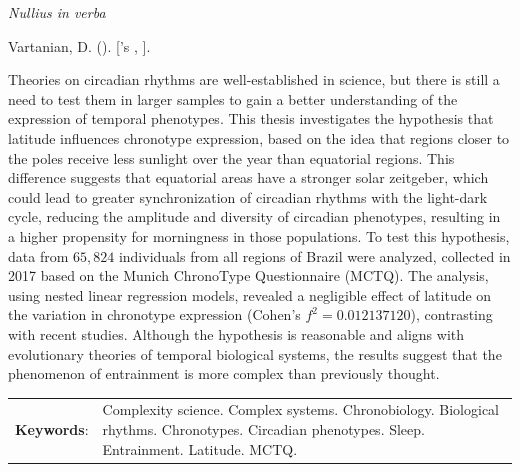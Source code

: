 \documentclass[
12pt,
openright,
oneside,
a4paper,
chapter=TITLE,
section=TITLE,
french,
spanish,
brazil,
english
]{abntex2}\usepackage{array}
\renewcommand{\epigraphname}{Epigraph}
\renewcommand{\resumoname}{Abstract}
\renewcommand{\epigraphname}{Epígrafe}
\renewcommand{\resumoname}{Resumo}
\renewcommand{\epigraphname}{Epígrafe}
\renewcommand{\resumoname}{Resumen}
\renewcommand{\epigraphname}{Épigraphe}
\renewcommand{\resumoname}{Résumé}
\providecommand{\imprimiruniversidade}{}
\providecommand{\imprimirtipodetituloacademico}{}
\newenvironment{resumoenv}[1][\resumoname]{
  \pretextualchapter{#1}
  \begingroup
  \setlength{\parindent}{0cm}
  \setlength{\parskip}{\smallskipamount} %
  \AtBeginEnvironment{tabular}{\normalsize}
  \renewcommand{\arraystretch}{1}
  \setlength{\aboverulesep}{0ex}
  \setlength{\belowrulesep}{0ex}
  \setlength{\arrayrulewidth}{0pt}
  \setlength{\tabcolsep}{0cm}
  \vspace{-\smallskipamount} %
  \begin{SingleSpace}
}{
  \end{SingleSpace}
  \cleardoublepage
  \endgroup
}
\begin{document}

\begin{epigrafe}[] %
\vspace*{\fill} %
\begin{flushright}
\textit{Nullius in verba}\footnotemark{}

\end{flushright}
\end{epigrafe}


\begin{resumoenv}[\resumoname]
Vartanian, D. ({\imprimirdata}). \textit{\imprimirtitulo} [{\imprimirtipodetituloacademico}'s {\imprimirtipotrabalho}, {\imprimiruniversidade}].


Theories on circadian rhythms are well-established in science, but there
is still a need to test them in larger samples to gain a better
understanding of the expression of temporal phenotypes. This thesis
investigates the hypothesis that latitude influences chronotype
expression, based on the idea that regions closer to the poles receive
less sunlight over the year than equatorial regions. This difference
suggests that equatorial areas have a stronger solar zeitgeber, which
could lead to greater synchronization of circadian rhythms with the
light-dark cycle, reducing the amplitude and diversity of circadian
phenotypes, resulting in a higher propensity for morningness in those
populations. To test this hypothesis, data from \(65,824\) individuals
from all regions of Brazil were analyzed, collected in 2017 based on the
Munich ChronoType Questionnaire (MCTQ). The analysis, using nested
linear regression models, revealed a negligible effect of latitude on
the variation in chronotype expression (Cohen's \(f^2 = 0.012137120\)),
contrasting with recent studies. Although the hypothesis is reasonable
and aligns with evolutionary theories of temporal biological systems,
the results suggest that the phenomenon of entrainment is more complex
than previously thought.


\begin{tabular}{p{2.3cm} p{13.6cm}}
  \textbf{Keywords}: & Complexity science. Complex systems. Chronobiology. Biological rhythms. Chronotypes. Circadian phenotypes. Sleep. Entrainment. Latitude. MCTQ.
\end{tabular}
\end{resumoenv}
\end{document}
